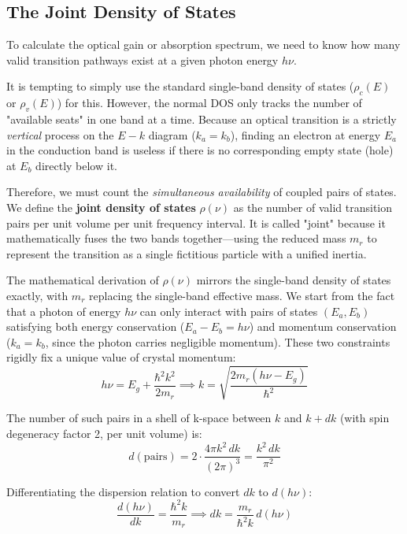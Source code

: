 \subsection{The Joint Density of States}

To calculate the optical gain or absorption spectrum, we need to know how many valid transition pathways exist at a given photon energy $h\nu$. 

It is tempting to simply use the standard single-band density of states ($\rho_c(E)$ or $\rho_v(E)$) for this. However, the normal DOS only tracks the number of "available seats" in one band at a time. Because an optical transition is a strictly \emph{vertical} process on the $E-k$ diagram ($k_a = k_b$), finding an electron at energy $E_a$ in the conduction band is useless if there is no corresponding empty state (hole) at $E_b$ directly below it. 

Therefore, we must count the \emph{simultaneous availability} of coupled pairs of states. We define the \textbf{joint density of states} $\rho(\nu)$ as the number of valid transition pairs per unit volume per unit frequency interval. It is called "joint" because it mathematically fuses the two bands together—using the reduced mass $m_r$ to represent the transition as a single fictitious particle with a unified inertia.

The mathematical derivation of $\rho(\nu)$ mirrors the single-band density of states exactly, with $m_r$ replacing the single-band effective mass. We start from the fact that a photon of energy $h\nu$ can only interact with pairs of states $(E_a, E_b)$ satisfying both energy conservation ($E_a - E_b = h\nu$) and momentum conservation ($k_a = k_b$, since the photon carries negligible momentum). These two constraints rigidly fix a unique value of crystal momentum:
\begin{equation*}
    h\nu = E_g + \frac{\hbar^2 k^2}{2m_r} \implies k = \sqrt{\frac{2m_r(h\nu - E_g)}{\hbar^2}}
\end{equation*}

The number of such pairs in a shell of k-space between $k$ and $k + dk$ (with spin degeneracy factor 2, per unit volume) is:
\begin{equation*}
    d(\text{pairs}) = 2\cdot\frac{4\pi k^2\,dk}{(2\pi)^3} = \frac{k^2\,dk}{\pi^2}
\end{equation*}

Differentiating the dispersion relation to convert $dk$ to $d(h\nu)$:
\begin{equation*}
    \frac{d(h\nu)}{dk} = \frac{\hbar^2 k}{m_r} \implies dk = \frac{m_r}{\hbar^2 k}\,d(h\nu)
\end{equation*}

